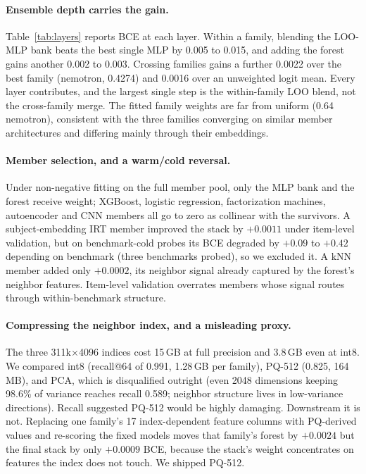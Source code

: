 \documentclass{article}
\begin{document}
\paragraph{Ensemble depth carries the gain.}
Table~\ref{tab:layers} reports BCE at each layer. Within a family, blending the LOO-MLP bank beats the best single MLP by 0.005 to 0.015, and adding the forest gains another 0.002 to 0.003. Crossing families gains a further 0.0022 over the best family (nemotron, 0.4274) and 0.0016 over an unweighted logit mean. Every layer contributes, and the largest single step is the within-family LOO blend, not the cross-family merge. The fitted family weights are far from uniform (0.64 nemotron), consistent with the three families converging on similar member architectures and differing mainly through their embeddings.

\paragraph{Member selection, and a warm/cold reversal.}
Under non-negative fitting on the full member pool, only the MLP bank and the forest receive weight; XGBoost, logistic regression, factorization machines, autoencoder and CNN members all go to zero as collinear with the survivors. A subject-embedding IRT member improved the stack by $+0.0011$ under item-level validation, but on benchmark-cold probes its BCE degraded by $+0.09$ to $+0.42$ depending on benchmark (three benchmarks probed), so we excluded it. A kNN member added only $+0.0002$, its neighbor signal already captured by the forest's neighbor features. Item-level validation overrates members whose signal routes through within-benchmark structure.

\paragraph{Compressing the neighbor index, and a misleading proxy.}
The three 311k$\times$4096 indices cost 15\,GB at full precision and 3.8\,GB even at int8. We compared int8 (recall@64 of 0.991, 1.28\,GB per family), PQ-512 (0.825, 164\,MB), and PCA, which is disqualified outright (even 2048 dimensions keeping 98.6\% of variance reaches recall 0.589; neighbor structure lives in low-variance directions). Recall suggested PQ-512 would be highly damaging. Downstream it is not. Replacing one family's 17 index-dependent feature columns with PQ-derived values and re-scoring the fixed models moves that family's forest by $+0.0024$ but the final stack by only $+0.0009$ BCE, because the stack's weight concentrates on features the index does not touch. We shipped PQ-512.
\end{document}

